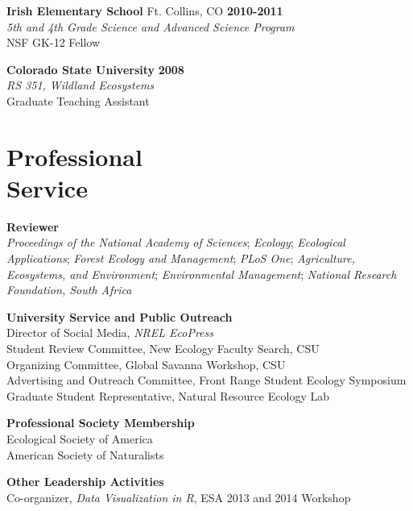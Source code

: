 \documentclass[margin,line]{resume}
\begin{document}
\begin{resume}
    \textbf{Irish Elementary School} Ft. Collins, CO \hfill \textbf{2010-2011}\\ 
   		\textsl{5th and 4th Grade Science and Advanced Science Program}\\
		NSF GK-12 Fellow
		
     \textbf{Colorado State University} \hfill \textbf{2008}\\ 
               \textsl{RS 351, Wildland Ecosystems}\\
               Graduate Teaching Assistant 

    \section{\mysidestyle Professional\\Service}
    \textbf{Reviewer}\\
    	\textsl{Proceedings of the National Academy of Sciences};
	\textsl{Ecology};
	\textsl{Ecological Applications};
	\textsl{Forest Ecology and Management};
	\textsl{PLoS One};
	\textsl{Agriculture, Ecosystems, and Environment};
	\textsl{Environmental Management};
	\textsl{National Research Foundation, South Africa}
	
   \textbf{University Service and Public Outreach}\\
   	Director of Social Media, \textsl{NREL EcoPress}\\
	Student Review Committee, New Ecology Faculty Search, CSU\\
	Organizing Committee, Global Savanna Workshop, CSU\\
	Advertising and Outreach Committee, Front Range Student Ecology Symposium\\
	Graduate Student Representative, Natural Resource Ecology Lab
	
  \newpage
  
    \textbf{Professional Society Membership}\\
    	Ecological Society of America\\
	American Society of Naturalists
	
    \textbf{Other Leadership Activities}\\
    	Co-organizer, \textsl{Data Visualization in R}, ESA 2013 and 2014 Workshop


\end{resume}
\end{document}
